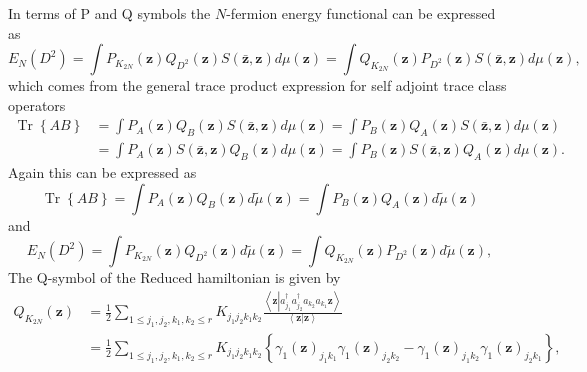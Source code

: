 \documentclass[aps,preprint]{revtex4}%
\begin{document}
In terms of P and Q symbols the $N$-fermion energy functional can be expressed
as
\begin{equation}
E_{N}\left(  D^{2}\right)  =\int P_{K_{2N}}\left(  \mathbf{z}\right)
Q_{D^{2}}\left(  \mathbf{z}\right)  S\left(  \mathbf{\bar{z},z}\right)
d\mu\left(  \mathbf{z}\right)  =\int Q_{K_{2N}}\left(  \mathbf{z}\right)
P_{D^{2}}\left(  \mathbf{z}\right)  S\left(  \mathbf{\bar{z},z}\right)
d\mu\left(  \mathbf{z}\right)  ,
\end{equation}
which comes from the general trace product expression for self adjoint trace
class operators
\begin{align}
\operatorname*{Tr}\left\{  AB\right\}    & =\int P_{A}\left(  \mathbf{z}%
\right)  Q_{B}\left(  \mathbf{z}\right)  S\left(  \mathbf{\bar{z},z}\right)
d\mu\left(  \mathbf{z}\right)  =\int P_{B}\left(  \mathbf{z}\right)
Q_{A}\left(  \mathbf{z}\right)  S\left(  \mathbf{\bar{z},z}\right)
d\mu\left(  \mathbf{z}\right)  \nonumber\\
& =\int P_{A}\left(  \mathbf{z}\right)  S\left(  \mathbf{\bar{z},z}\right)
Q_{B}\left(  \mathbf{z}\right)  d\mu\left(  \mathbf{z}\right)  =\int
P_{B}\left(  \mathbf{z}\right)  S\left(  \mathbf{\bar{z},z}\right)
Q_{A}\left(  \mathbf{z}\right)  d\mu\left(  \mathbf{z}\right)  .
\end{align}
Again this can be expressed as
\begin{equation}
\operatorname*{Tr}\left\{  AB\right\}  =\int P_{A}\left(  \mathbf{z}\right)
Q_{B}\left(  \mathbf{z}\right)  d\tilde{\mu}\left(  \mathbf{z}\right)  =\int
P_{B}\left(  \mathbf{z}\right)  Q_{A}\left(  \mathbf{z}\right)  d\tilde{\mu
}\left(  \mathbf{z}\right)
\end{equation}
and%
\begin{equation}
E_{N}\left(  D^{2}\right)  =\int P_{K_{2N}}\left(  \mathbf{z}\right)
Q_{D^{2}}\left(  \mathbf{z}\right)  d\tilde{\mu}\left(  \mathbf{z}\right)
=\int Q_{K_{2N}}\left(  \mathbf{z}\right)  P_{D^{2}}\left(  \mathbf{z}\right)
d\tilde{\mu}\left(  \mathbf{z}\right)  ,
\end{equation}
The Q-symbol of the Reduced hamiltonian is given by
\begin{align}
Q_{K_{2N}}\left(  \mathbf{z}\right)   &  =\frac{1}{2}\sum_{1\leq j_{1}%
,j_{2},k_{1},k_{2}\leq r}K_{j_{1}j_{2}k_{1}k_{2}}\frac{\left\langle
\mathbf{z}\left\vert a_{j_{1}}^{\dagger}a_{j_{2}}^{\dagger}a_{k_{2}}a_{k_{1}%
}\mathbf{z}\right.  \right\rangle }{\left\langle \mathbf{z}\left\vert
\mathbf{z}\right.  \right\rangle }\nonumber\\
&  =\frac{1}{2}\sum_{1\leq j_{1},j_{2},k_{1},k_{2}\leq r}K_{j_{1}j_{2}%
k_{1}k_{2}}\left\{  \gamma_{1}\left(  \mathbf{z}\right)  _{j_{1}k_{1}}%
\gamma_{1}\left(  \mathbf{z}\right)  _{j_{2}k_{2}}-\gamma_{1}\left(
\mathbf{z}\right)  _{j_{1}k_{2}}\gamma_{1}\left(  \mathbf{z}\right)
_{j_{2}k_{1}}\right\}  ,
\end{align}
\end{document}
